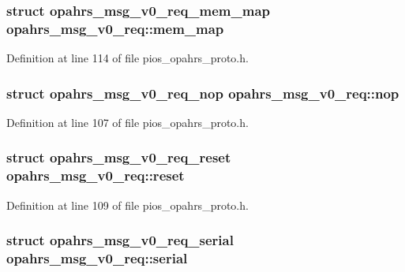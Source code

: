 \hypertarget{unionopahrs__msg__v0__req_ae7015e9b8e2297ee30f63871354a648f}{
\subsubsection[{mem\-\_\-map}]{\setlength{\rightskip}{0pt plus 5cm}struct {\bf opahrs\-\_\-msg\-\_\-v0\-\_\-req\-\_\-mem\-\_\-map} opahrs\-\_\-msg\-\_\-v0\-\_\-req\-::mem\-\_\-map}}\label{unionopahrs__msg__v0__req_ae7015e9b8e2297ee30f63871354a648f}


Definition at line 114 of file pios\-\_\-opahrs\-\_\-proto.\-h.

\hypertarget{unionopahrs__msg__v0__req_a32d0393f76afbbe97fc454e33283cee1}{
\subsubsection[{nop}]{\setlength{\rightskip}{0pt plus 5cm}struct {\bf opahrs\-\_\-msg\-\_\-v0\-\_\-req\-\_\-nop} opahrs\-\_\-msg\-\_\-v0\-\_\-req\-::nop}}\label{unionopahrs__msg__v0__req_a32d0393f76afbbe97fc454e33283cee1}


Definition at line 107 of file pios\-\_\-opahrs\-\_\-proto.\-h.

\hypertarget{unionopahrs__msg__v0__req_acb5491cb4850c02860cbfed8b507c877}{
\subsubsection[{reset}]{\setlength{\rightskip}{0pt plus 5cm}struct {\bf opahrs\-\_\-msg\-\_\-v0\-\_\-req\-\_\-reset} opahrs\-\_\-msg\-\_\-v0\-\_\-req\-::reset}}\label{unionopahrs__msg__v0__req_acb5491cb4850c02860cbfed8b507c877}


Definition at line 109 of file pios\-\_\-opahrs\-\_\-proto.\-h.

\hypertarget{unionopahrs__msg__v0__req_ad28569a7d93f8cc5a4776b44c87fe0b2}{
\subsubsection[{serial}]{\setlength{\rightskip}{0pt plus 5cm}struct {\bf opahrs\-\_\-msg\-\_\-v0\-\_\-req\-\_\-serial} opahrs\-\_\-msg\-\_\-v0\-\_\-req\-::serial}}\label{unionopahrs__msg__v0__req_ad28569a7d93f8cc5a4776b44c87fe0b2}



